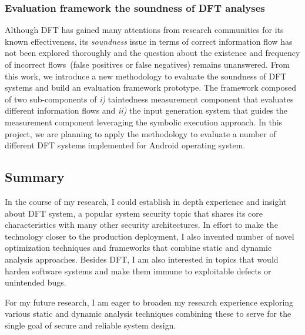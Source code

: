 \documentclass[letterpaper, 10pt]{article}
\begin{document}
\begin{small}
%

\subsubsection*{Evaluation framework the soundness of DFT analyses}
%
Although DFT has gained many attentions from research communities for its known
effectiveness, its {\it soundness} issue in terms of correct information flow
has not been explored thoroughly and the question about the existence and
frequency of incorrect flows~(false positives or false negatives) remains
unanswered. From this work, we introduce a new methodology to evaluate the
soundness of DFT systems and build an evaluation framework prototype. 
%
The framework composed of two sub-components of {\it i)} taintedness
measurement component that evaluates different information flows and {\it ii)}
the input generation system that guides the measurement component leveraging
the symbolic execution approach.
%
In this project, we are planning to apply the methodology to evaluate a number
of different DFT systems implemented for Android operating system.

\subsection*{Summary} 
%
In the course of my research, I could establish in depth experience and insight
about DFT system, a popular system security topic that shares its core
characteristics with many other security architectures.
%
In effort to make the technology closer to the production deployment, I also
invented number of novel optimization techniques and frameworks that combine
static and dynamic analysis approaches.
%
Besides DFT, I am also interested in topics that would harden software systems
and make them immune to exploitable defects or unintended bugs. 

For my future research, I am eager to broaden my research experience
exploring various static and dynamic analysis techniques combining these to
serve for the single goal of secure and reliable system design.

\end{small} 




\end{document}
